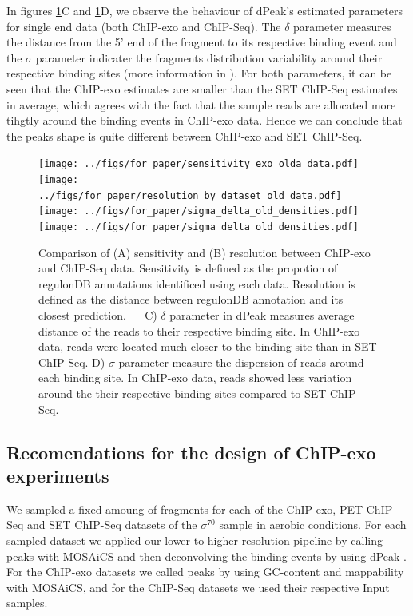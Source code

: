 \documentclass{bmcart}\usepackage[]{graphicx}\usepackage[]{color}
\begin{document}
In figures \ref{fig:reso_all}C and \ref{fig:reso_all}D, we observe the
behaviour of dPeak's estimated parameters for single end data (both
ChIP-exo and ChIP-Seq). The $\delta$ parameter measures the distance
from the 5' end of the fragment to its respective binding event and
the $\sigma$ parameter indicater the fragments distribution
variability around their respective binding sites (more information in
\cite{dpeak}). For both parameters, it can be seen that the ChIP-exo
estimates are smaller than the SET ChIP-Seq estimates in average,
which agrees with the fact that the sample reads are allocated more
tihgtly around the binding events in ChIP-exo data. Hence we can
conclude that the peaks shape is quite different between ChIP-exo and
SET ChIP-Seq.


\begin{figure}[h!]
  \centering
  \texttt{[image: ../figs/for\_paper/sensitivity\_exo\_olda\_data.pdf]}
  \texttt{[image: ../figs/for\_paper/resolution\_by\_dataset\_old\_data.pdf]}
   \texttt{[image: ../figs/for\_paper/sigma\_delta\_old\_densities.pdf]}
   \texttt{[image: ../figs/for\_paper/sigma\_delta\_old\_densities.pdf]} 

   \caption{Comparison of (A) sensitivity and (B) resolution between
     ChIP-exo and ChIP-Seq data. Sensitivity is defined as the
     propotion of regulonDB annotations identificed using each
     data. Resolution is defined as the distance between regulonDB
     annotation and its closest prediction. $\quad$ C) $\delta$ parameter in
     dPeak measures average distance of the reads to their respective
     binding site. In ChIP-exo data, reads were located much closer to
     the binding site than in SET ChIP-Seq. D) $\sigma$ parameter
     measure the dispersion of reads around each binding site. In
     ChIP-exo data, reads showed less variation around the their
     respective binding sites compared to SET ChIP-Seq.}
  \label{fig:reso_all}
\end{figure}

\subsection{Recomendations for the design of ChIP-exo experiments}
\label{sec:reco}




We sampled a fixed amoung of fragments for each of the ChIP-exo, PET
ChIP-Seq and SET ChIP-Seq datasets of the $\sigma^{70}$ sample in
aerobic conditions. For each sampled dataset we applied our
lower-to-higher resolution pipeline by calling peaks with MOSAiCS
\cite{mosaics} and then deconvolving the binding events by using dPeak
\cite{dpeak}. For the ChIP-exo datasets we called peaks by using
GC-content and mappability with MOSAiCS, and for the ChIP-Seq datasets
we used their respective Input samples.
\end{document}
